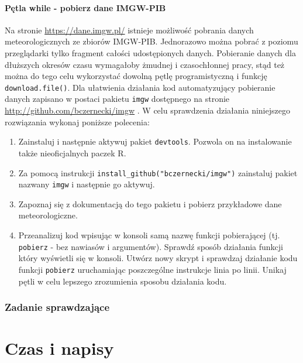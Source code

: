 \documentclass[]{book}
\providecommand{\tightlist}{%
  \setlength{\itemsep}{0pt}\setlength{\parskip}{0pt}}
\theoremstyle{definition}
\theoremstyle{definition}
\theoremstyle{definition}
\theoremstyle{remark}
\begin{document}
\subsubsection*{Pętla while - pobierz dane
IMGW-PIB}\label{petla-while---pobierz-dane-imgw-pib}

Na stronie \url{https://dane.imgw.pl/} istnieje możliwość pobrania
danych meteorologicznych ze zbiorów IMGW-PIB. Jednorazowo można pobrać z
poziomu przeglądarki tylko fragment całości udostępionych danych.
Pobieranie danych dla dłuższych okresów czasu wymagałoby żmudnej i
czasochłonnej pracy, stąd też można do tego celu wykorzystać dowolną
pętlę programistyczną i funkcję \texttt{download.file()}. Dla ułatwienia
działania kod automatyzujący pobieranie danych zapisano w postaci
pakietu \texttt{imgw} dostępnego na stronie
\url{http://github.com/bczernecki/imgw} . W celu sprawdzenia działania
niniejszego rozwiązania wykonaj poniższe polecenia:

\begin{enumerate}
\def\labelenumi{\arabic{enumi}.}
\tightlist
\item
  Zainstaluj i następnie aktywuj pakiet \texttt{devtools}. Pozwola on na
  instalowanie także nieoficjalnych paczek R.
\item
  Za pomocą instrukcji \texttt{install\_github("bczernecki/imgw")}
  zainstaluj pakiet nazwany \texttt{imgw} i następnie go aktywuj.
\item
  Zapoznaj się z dokumentacją do tego pakietu i pobierz przykładowe dane
  meteorologiczne.
\item
  Przeanalizuj kod wpisując w konsoli samą nazwę funkcji pobierającej
  (tj. \texttt{pobierz} - bez nawiasów i argumentów). Sprawdź sposób
  działania funkcji który wyświetli się w konsoli. Utwórz nowy skrypt i
  sprawdzaj działanie kodu funkcji \texttt{pobierz} uruchamiając
  poszczególne instrukcje linia po linii. Unikaj pętli w celu lepszego
  zrozumienia sposobu działania kodu.
\end{enumerate}

\subsection*{Zadanie sprawdzające}\label{zadanie-sprawdzajace-1}

\chapter{Czas i napisy}\label{czas-i-napisy}
\end{document}
